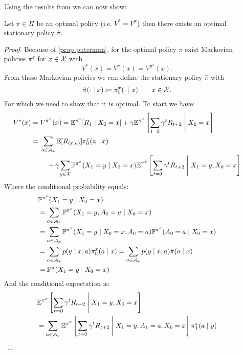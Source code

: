 Using the results from \citeauthor{putermanMarkovDecisionProcesses2005} we can now show:
\begin{thm}\label{optimal policy => opt stat policy}
	Let \(\pi\in\Pi\) be an optimal policy (i.e. \(V^*=V^\pi\)) then there exists an optimal stationary policy \(\hat{\pi}\).
\end{thm}
\begin{proof}
	Because of \ref{prop puterman}, for the optimal policy \(\pi\) exist Markovian policies \(\pi^x\) for \(x\in\mathcal{X}\) with
	\[
		V^*(x)=V^\pi(x)=V^{\pi^x}(x).
	\]
	From these Markovian policies we can define the stationary policy \(\hat{\pi}\) with
	\begin{align}
		\hat{\pi}(\cdot\mid x)\coloneqq \pi_0^x(\cdot\mid x) \qquad x\in\mathcal{X}.
	\end{align}
	For which we need to show that it is optimal. To start we have:
	\begin{align}
		V^*(x)&=V^{\pi^x}(x)=\E^{\pi^x}[R_1\mid X_0=x] 
		+ \gamma \E^{\pi^x}\left[\sum_{t=0}\gamma^t R_{t+2}\;\middle|\; X_0=x \right] \nonumber\\
		&=\begin{aligned}[t]
			&\sum_{a\in\cA_x}\E[R_{(x,a)}]\pi_0^x(a\mid x)\\
			&\quad + \gamma \smashoperator{\sum_{y\in\cX}}\Pr^{\pi^x}(X_1=y\mid X_0=x)
			\E^{\pi^x}\left[\sum_{t=0}\gamma^t R_{t+2}\;\middle|\; X_1=y, X_0=x\right]\label{V^pi^x expanded}
		\end{aligned}
	\end{align}
	Where the conditional probability equals:
	\begin{align}
		&\mathbb{P}^{\pi^x}(X_1=y\mid X_0=x) \nonumber \\
		&=\sum_{a\in\mathcal{A}_x} \mathbb{P}^{\pi^x}(X_1=y, A_0=a \mid X_0=x) \nonumber\\
		&=\sum_{a\in\mathcal{A}_x} \mathbb{P}^{\pi^x}(X_1=y\mid X_0=x, A_0=a) \mathbb{P}^{\pi^x}(A_0=a\mid X_0=x)\nonumber\\
		&=\sum_{a\in\mathcal{A}_x} p(y\mid x,a) \pi^x_0(a\mid x)
		=\sum_{a\in\mathcal{A}_x} p(y\mid x,a) \hat{\pi}(a\mid x) \nonumber\\
		&=\mathbb{P}^{\hat{\pi}}(X_1=y\mid X_0=x)
	\end{align}
	And the conditional expectation is:
	\begin{align}
		&\E^{\pi^x}\left[\sum_{t=0}\gamma^t R_{t+2}\;\middle|\; X_1=y, X_0=x\right]\nonumber\\
		&=\sum_{a\in\cA_y}
		\E^{\pi^x}\left[\sum_{t=0}\gamma^t R_{t+2}\;\middle|\; X_1=y, A_1=a, X_0=x\right]\pi^x_1(a\mid y)\nonumber\\

\end{align}
\end{proof}
